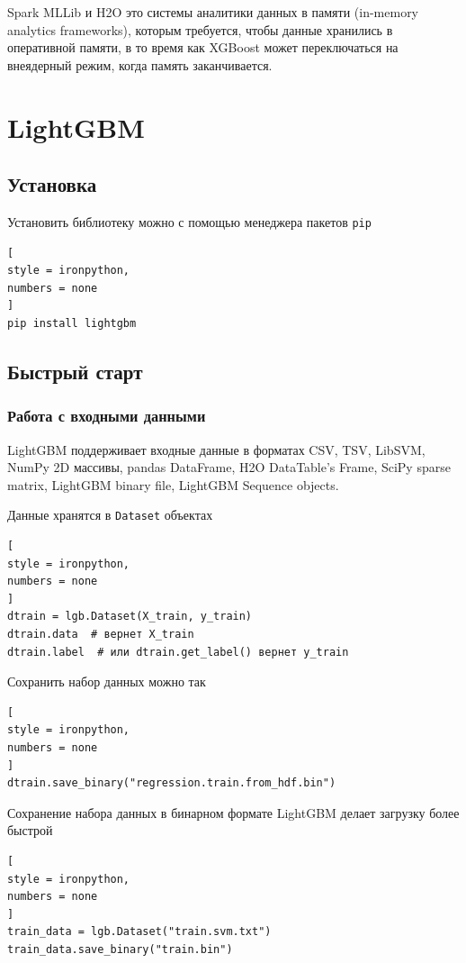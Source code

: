 \documentclass[%
	11pt,
	a4paper,
	utf8,
		]{article}
\begin{document}
Spark MLLib и H2O это системы аналитики данных в памяти (in-memory analytics frameworks), которым требуется, чтобы данные хранились в оперативной памяти, в то время как XGBoost может переключаться на внеядерный режим, когда память заканчивается.











\section{LightGBM}

\subsection{Установка}

Установить библиотеку можно с помощью менеджера пакетов \verb|pip|
\begin{lstlisting}[
style = ironpython,
numbers = none
]
pip install lightgbm
\end{lstlisting}

\subsection{Быстрый старт}

\subsubsection{Работа с входными данными}

LightGBM поддерживает входные данные в форматах CSV, TSV, LibSVM, NumPy 2D массивы, pandas DataFrame, H2O DataTable's Frame, SciPy sparse matrix, LightGBM binary file, LightGBM Sequence objects.

Данные хранятся в \verb|Dataset| объектах
\begin{lstlisting}[
style = ironpython,
numbers = none
]
dtrain = lgb.Dataset(X_train, y_train)
dtrain.data  # вернет X_train
dtrain.label  # или dtrain.get_label() вернет y_train
\end{lstlisting}

Сохранить набор данных можно так
\begin{lstlisting}[
style = ironpython,
numbers = none
]
dtrain.save_binary("regression.train.from_hdf.bin")
\end{lstlisting}

Сохранение набора данных в бинарном формате LightGBM делает загрузку более быстрой
\begin{lstlisting}[
style = ironpython,
numbers = none
]
train_data = lgb.Dataset("train.svm.txt")
train_data.save_binary("train.bin")
\end{lstlisting}
\end{document}
